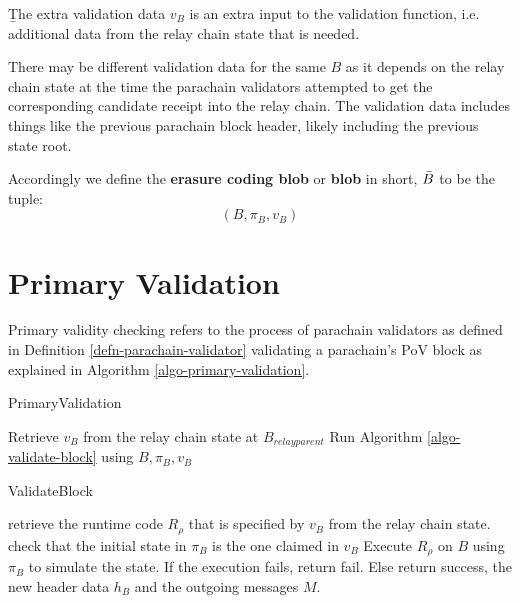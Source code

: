 \begin{definition}  \label{defn-extra-validation-data}
  {\b The extra validation data} $v_B$  is an extra input to the validation function, i.e. additional data from the relay chain state that is needed.
\end{definition}

There may be different validation data for the same $B$ as it depends on the relay chain state at the time the parachain validators attempted to get the corresponding candidate receipt into the relay chain. The validation data includes things like the previous parachain block header, likely including the previous state root.

\begin{definition}
  \label{defn-blob}
  Accordingly we define the {\bf erasure coding blob} or {\bf blob} in short, {\bf $\bar{B}$} to be the tuple:
  \[
  (B, \pi_B, v_B)
  \]
\end{definition}

\section{Primary Validation}
\label{sect-primary-validation}

Primary validity checking refers to the process of parachain validators as defined in Definition \ref{defn-parachain-validator} validating a parachain's PoV block as explained in Algorithm \ref{algo-primary-validation}.

\begin{algorithm}
  \caption[]{\sc PrimaryValidation}
  \label{algo-primary-validation}
  \begin{algorithmic}[1]
    
    \State Retrieve $v_B$ from the relay chain state at $B_{relay parent}$
    \State Run Algorithm \ref{algo-validate-block} using $B, \pi_B, v_B$
  \end{algorithmic}
\end{algorithm}

\begin{algorithm}
  \caption[]{\sc ValidateBlock}
  \label{algo-validate-block}
  \begin{algorithmic}[1]
    \State retrieve the runtime code $R_\rho$ that is specified by $v_B$ from the relay chain state.
    \State check that the initial state in $\pi_B$ is the one claimed in $v_B$
    \State Execute $R_\rho$ on $B$ using $\pi_B$ to simulate the state.    
    \State If the execution fails, return fail.
    \State Else return success, the new header data $h_B$ and the outgoing messages $M$.
  \end{algorithmic}
\end{algorithm}

